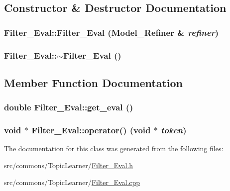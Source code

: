 \subsection{Constructor \& Destructor Documentation}
\hypertarget{class_filter___eval_a045ecc48dc003fcf28074ecf9459aecd}{
\subsubsection[{Filter\_\-Eval}]{\setlength{\rightskip}{0pt plus 5cm}Filter\_\-Eval::Filter\_\-Eval ({\bf Model\_\-Refiner} \& {\em refiner})}}
\label{class_filter___eval_a045ecc48dc003fcf28074ecf9459aecd}
\hypertarget{class_filter___eval_a37b840fc1b612ea3814985d5149de219}{
\subsubsection[{$\sim$Filter\_\-Eval}]{\setlength{\rightskip}{0pt plus 5cm}Filter\_\-Eval::$\sim$Filter\_\-Eval ()}}
\label{class_filter___eval_a37b840fc1b612ea3814985d5149de219}


\subsection{Member Function Documentation}
\hypertarget{class_filter___eval_afe2256ba9ad738c4ffb23164df38d76a}{
\subsubsection[{get\_\-eval}]{\setlength{\rightskip}{0pt plus 5cm}double Filter\_\-Eval::get\_\-eval ()}}
\label{class_filter___eval_afe2256ba9ad738c4ffb23164df38d76a}
\hypertarget{class_filter___eval_aa76e239d1c12bb4d5d0ffd6b4b70bdbc}{
\subsubsection[{operator()}]{\setlength{\rightskip}{0pt plus 5cm}void $\ast$ Filter\_\-Eval::operator() (void $\ast$ {\em token})}}
\label{class_filter___eval_aa76e239d1c12bb4d5d0ffd6b4b70bdbc}


The documentation for this class was generated from the following files:\begin{DoxyCompactItemize}
\item 
src/commons/TopicLearner/\hyperlink{_filter___eval_8h}{Filter\_\-Eval.h}\item 
src/commons/TopicLearner/\hyperlink{_filter___eval_8cpp}{Filter\_\-Eval.cpp}\end{DoxyCompactItemize}
